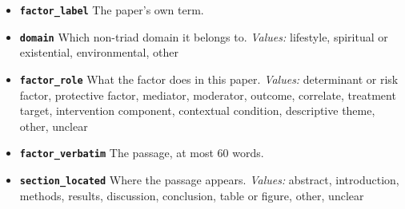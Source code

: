 \documentclass[11pt]{article}
\begin{document}
\begin{description}
  \begin{itemize}[leftmargin=1.3em,itemsep=1pt,topsep=2pt]
  \item \textbf{\texttt{factor\_label}} The paper's own term.
  \item \textbf{\texttt{domain}} Which non-triad domain it belongs to. {\small \textit{Values:} lifestyle, spiritual or existential, environmental, other}
  \item \textbf{\texttt{factor\_role}} What the factor does in this paper. {\small \textit{Values:} determinant or risk factor, protective factor, mediator, moderator, outcome, correlate, treatment target, intervention component, contextual condition, descriptive theme, other, unclear}
  \item \textbf{\texttt{factor\_verbatim}} The passage, at most 60 words.
  \item \textbf{\texttt{section\_located}} Where the passage appears. {\small \textit{Values:} abstract, introduction, methods, results, discussion, conclusion, table or figure, other, unclear}
  \end{itemize}
\end{description}
\end{document}

